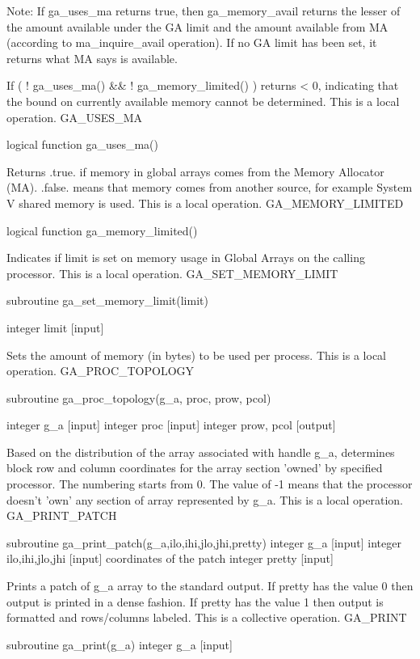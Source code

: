 Note: If ga\_uses\_ma returns true, then ga\_memory\_avail returns
the lesser of the amount available under the GA limit and the amount
available from MA (according to ma\_inquire\_avail operation). If
no GA limit has been set, it returns what MA says is available.

If ( ! ga\_uses\_ma() \&\& ! ga\_memory\_limited() ) returns < 0,
indicating that the bound on currently available memory cannot be
determined. This is a local operation. GA\_USES\_MA

logical function ga\_uses\_ma()

Returns .true. if memory in global arrays comes from the Memory Allocator
(MA). .false. means that memory comes from another source, for example
System V shared memory is used. This is a local operation. GA\_MEMORY\_LIMITED

logical function ga\_memory\_limited()

Indicates if limit is set on memory usage in Global Arrays on the
calling processor. This is a local operation. GA\_SET\_MEMORY\_LIMIT

subroutine ga\_set\_memory\_limit(limit)

integer limit {[}input{]}

Sets the amount of memory (in bytes) to be used per process. This
is a local operation. GA\_PROC\_TOPOLOGY

subroutine ga\_proc\_topology(g\_a, proc, prow, pcol)

integer g\_a {[}input{]} integer proc {[}input{]} integer prow, pcol
{[}output{]}

Based on the distribution of the array associated with handle g\_a,
determines block row and column coordinates for the array section
'owned' by specified processor. The numbering starts from 0. The value
of -1 means that the processor doesn't 'own' any section of array
represented by g\_a. This is a local operation. GA\_PRINT\_PATCH

subroutine ga\_print\_patch(g\_a,ilo,ihi,jlo,jhi,pretty) integer g\_a
{[}input{]} integer ilo,ihi,jlo,jhi {[}input{]} coordinates of the
patch integer pretty {[}input{]}

Prints a patch of g\_a array to the standard output. If pretty has
the value 0 then output is printed in a dense fashion. If pretty has
the value 1 then output is formatted and rows/columns labeled. This
is a collective operation. GA\_PRINT

subroutine ga\_print(g\_a) integer g\_a {[}input{]}

